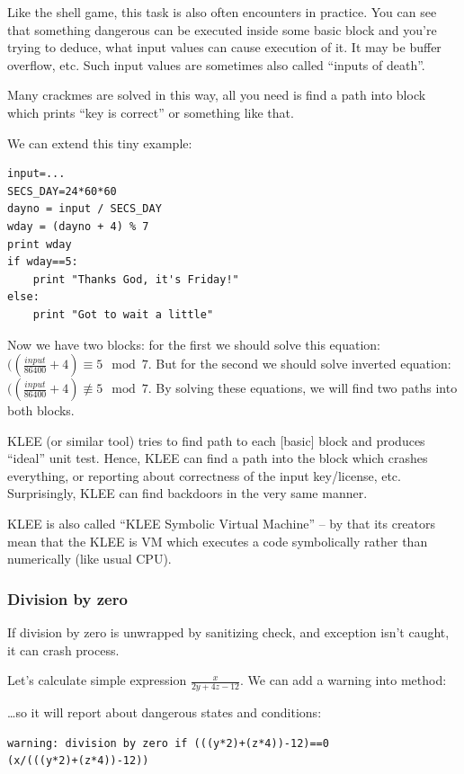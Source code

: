 Like the shell game, this task is also often encounters in practice.
You can see that something dangerous can be executed inside some basic block and you're trying to deduce,
what input values can cause execution of it.
It may be buffer overflow, etc.
Such input values are sometimes also called ``inputs of death''.

Many crackmes are solved in this way, all you need is find a path into block which prints ``key is correct''
or something like that.

We can extend this tiny example:

\begin{lstlisting}
input=...
SECS_DAY=24*60*60
dayno = input / SECS_DAY
wday = (dayno + 4) % 7
print wday
if wday==5:
    print "Thanks God, it's Friday!"
else:
    print "Got to wait a little"
\end{lstlisting}

Now we have two blocks: for the first we should solve this equation: $((\frac{input}{86400}+4) \equiv 5 \mod 7$.
But for the second we should solve inverted equation: $((\frac{input}{86400}+4) \not\equiv 5 \mod 7$.
By solving these equations, we will find two paths into both blocks.

KLEE (or similar tool) tries to find path to each [basic] block and produces ``ideal'' unit test.
Hence, KLEE can find a path into the block which crashes everything, or reporting about correctness of the input
key/license, etc.
Surprisingly, KLEE can find backdoors in the very same manner.

KLEE is also called ``KLEE Symbolic Virtual Machine'' -- by that its creators mean that the KLEE is \ac{VM} which executes a code symbolically rather than numerically (like usual \ac{CPU}).

\subsubsection{Division by zero}

If division by zero is unwrapped by sanitizing check, and exception isn't caught, it can crash process.

Let's calculate simple expression $\frac{x}{2y + 4z - 12}$.
We can add a warning into  method:



\dots so it will report about dangerous states and conditions:

\begin{lstlisting}
warning: division by zero if (((y*2)+(z*4))-12)==0
(x/(((y*2)+(z*4))-12))
\end{lstlisting}

